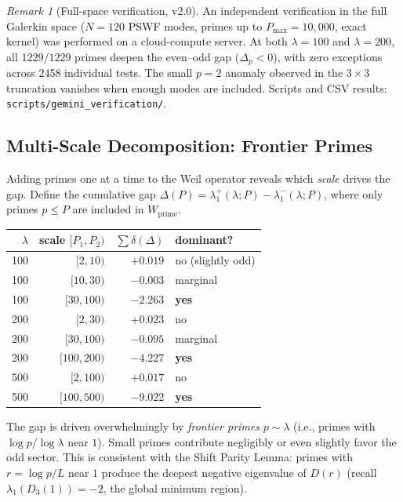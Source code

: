 \documentclass[12pt,a4paper]{article}
\theoremstyle{definition}
\theoremstyle{remark}
\newtheorem{remark}[theorem]{Remark}
\begin{document}
\begin{remark}[Full-space verification, v2.0]
An independent verification in the full Galerkin space ($N = 120$ PSWF modes, primes up to $P_{\max} = 10{,}000$, exact kernel) was performed on a cloud-compute server. At both $\lambda = 100$ and $\lambda = 200$, all $1229/1229$ primes deepen the even--odd gap ($\Delta_p < 0$), with zero exceptions across 2458 individual tests. The small $p = 2$ anomaly observed in the $3 \times 3$ truncation vanishes when enough modes are included. Scripts and CSV results: \texttt{scripts/gemini\_verification/}.
\end{remark}

\subsection{Multi-Scale Decomposition: Frontier Primes}
\label{sec:frontier}

Adding primes one at a time to the Weil operator reveals which \emph{scale} drives the gap. Define the cumulative gap $\Delta(P) = \lambda_1^+(\lambda; P) - \lambda_1^-(\lambda; P)$, where only primes $p \leq P$ are included in $W_{\mathrm{prime}}$.

\begin{center}
\renewcommand{\arraystretch}{1.15}
\begin{tabular}{r|r|r|l}
$\lambda$ & scale $[P_1, P_2)$ & $\sum \delta(\Delta)$ & dominant? \\\hline
100 & $[2, 10)$ & $+0.019$ & no (slightly odd) \\
100 & $[10, 30)$ & $-0.003$ & marginal \\
100 & $[30, 100)$ & $-2.263$ & \textbf{yes} \\[3pt]
200 & $[2, 30)$ & $+0.023$ & no \\
200 & $[30, 100)$ & $-0.095$ & marginal \\
200 & $[100, 200)$ & $-4.227$ & \textbf{yes} \\[3pt]
500 & $[2, 100)$ & $+0.017$ & no \\
500 & $[100, 500)$ & $-9.022$ & \textbf{yes}
\end{tabular}
\end{center}

The gap is driven overwhelmingly by \emph{frontier primes} $p \sim \lambda$ (i.e., primes with $\log p / \log\lambda$ near $1$). Small primes contribute negligibly or even slightly favor the odd sector. This is consistent with the Shift Parity Lemma: primes with $r = \log p / L$ near $1$ produce the deepest negative eigenvalue of $D(r)$ (recall $\lambda_1(D_3(1)) = -2$, the global minimum region).
\end{document}
